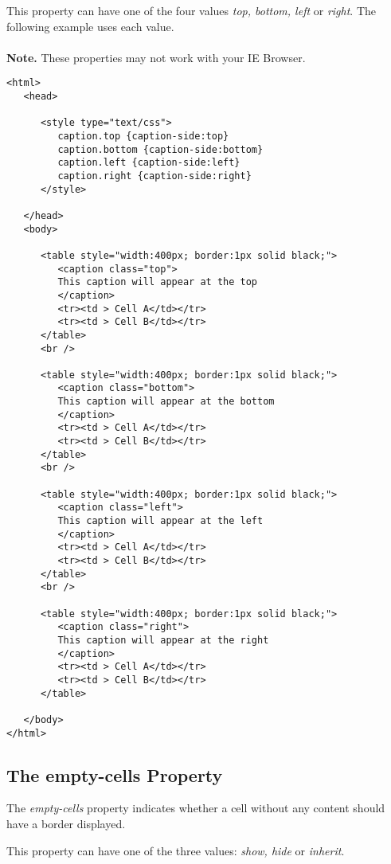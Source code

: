 \documentclass[a4paper,oneside]{book}
\numberwithin{equation}{chapter}
\begin{document}
This property can have one of the four values \textit{top, bottom, left} or \textit{right}. The following example uses each value.\\
\\
\textbf{Note.} These properties may not work with your IE Browser.
\begin{verbatim}
<html>
   <head>
   
      <style type="text/css">
         caption.top {caption-side:top}
         caption.bottom {caption-side:bottom}
         caption.left {caption-side:left}
         caption.right {caption-side:right}
      </style>
      
   </head>
   <body>
   
      <table style="width:400px; border:1px solid black;">
         <caption class="top">
         This caption will appear at the top
         </caption>
         <tr><td > Cell A</td></tr>
         <tr><td > Cell B</td></tr>
      </table>
      <br />
      
      <table style="width:400px; border:1px solid black;">
         <caption class="bottom">
         This caption will appear at the bottom
         </caption>
         <tr><td > Cell A</td></tr>
         <tr><td > Cell B</td></tr>
      </table>
      <br />
      
      <table style="width:400px; border:1px solid black;">
         <caption class="left">
         This caption will appear at the left
         </caption>
         <tr><td > Cell A</td></tr>
         <tr><td > Cell B</td></tr>
      </table>
      <br />
      
      <table style="width:400px; border:1px solid black;">
         <caption class="right">
         This caption will appear at the right
         </caption>
         <tr><td > Cell A</td></tr>
         <tr><td > Cell B</td></tr>
      </table>
      
   </body>
</html> 
\end{verbatim}
\subsection{The empty-cells Property}
The \textit{empty-cells} property indicates whether a cell without any content should have a border displayed.

This property can have one of the three values: \textit{show, hide} or \textit{inherit}.
\end{document}
